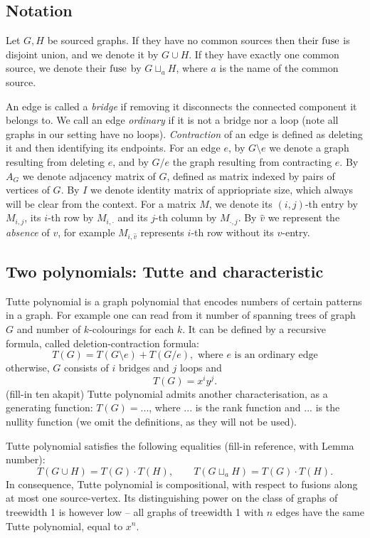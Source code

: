 \subsection{Notation}
Let $G,H$ be sourced graphs. If they have no common sources then their $\operatorname{fuse}$ is disjoint union, and we denote it by $G\cup H$. If they have exactly one common source, we denote their $\operatorname{fuse}$ by $G\sqcup_a H$, where $a$ is the name of the common source. 

An edge is called a \emph{bridge} if removing it disconnects the connected component it belongs to. We call an edge \emph{ordinary} if it is not a bridge nor a loop (note all graphs in our setting have no loops). \emph{Contraction} of an edge is defined as deleting it and then identifying its endpoints. For an edge $e$, by $G \setminus e$ we denote a graph resulting from deleting $e$, and by $G/e$ the graph resulting from contracting $e$. By $A_G$ we denote adjacency matrix of $G$, defined as matrix indexed by pairs of vertices of $G$. By $I$ we denote identity matrix of appriopriate size, which always will be clear from the context. For a matrix $M$, we denote its $(i,j)$-th entry by $M_{i,j}$, its $i$-th row by $M_{i,\cdot}$ and its $j$-th column by $M_{\cdot, j}$. By $\widehat{v}$ we represent the \emph{absence} of $v$, for example $M_{i, \widehat{v}}$ represents $i$-th row without its $v$-entry.
\subsection{Two polynomials: Tutte and characteristic}
Tutte polynomial is a graph polynomial that encodes numbers of certain patterns in a graph. For example one can read from it number of spanning trees of graph $G$ and number of $k$-colourings for each $k$. It can be defined by a recursive formula, called deletion-contraction formula:
$$
	T(G) = T(G\setminus e) + T(G/e), \text{ where } e \text{ is an ordinary edge}
$$
\indent otherwise, $G$ consists of $i$ bridges and $j$ loops and
$$
	T(G) = x^iy^j.
$$
(fill-in ten akapit) Tutte polynomial admits another characterisation, as a generating function: $T(G) = ...$, where $...$ is the rank function and $...$ is the nullity function (we omit the definitions, as they will not be used).

Tutte polynomial satisfies the following equalities (fill-in reference, with Lemma number):
$$
T(G\cup H) = T(G) \cdot T(H), \qquad T(G\sqcup_a H) = T(G) \cdot T(H).
$$
In consequence, Tutte polynomial is compositional, with respect to fusions along at most one source-vertex. %
Its distinguishing power on the class of graphs of treewidth 1 is however low -- all graphs of treewidth 1 with $n$ edges have the same Tutte polynomial, equal to $x^n$.

